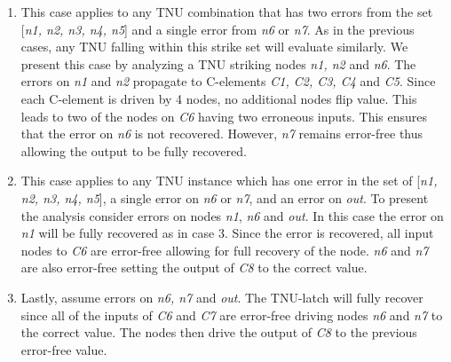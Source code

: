 \begin{enumerate}
	\item This case applies to any TNU combination that has two errors from the set [\textit{n1, n2, n3, n4, n5}] and a single error from \textit{n6} or \textit{n7}. As in the previous cases, any TNU falling within this strike set will evaluate similarly. We present this case by analyzing a TNU striking nodes \textit{n1, n2} and \textit{n6}. The errors on \textit{n1} and \textit{n2} propagate to C-elements \textit{C1, C2, C3, C4} and \textit{C5}. Since each C-element is driven by 4 nodes, no additional nodes flip value. This leads to two of the nodes on \textit{C6} having two erroneous inputs. This ensures that the error on \textit{n6} is not recovered. However, \textit{n7} remains error-free thus allowing the output to be fully recovered. 
	
	\item This case applies to any TNU instance which has one error in the set of [\textit{n1, n2, n3, n4, n5}], a single error on \textit{n6} or \textit{n7}, and an error on \textit{out}. To present the analysis consider errors on nodes \textit{n1}, \textit{n6} and \textit{out}. In this case the error on \textit{n1} will be fully recovered as in case 3. Since the error is recovered, all input nodes to \textit{C6} are error-free allowing for full recovery of the node. \textit{n6} and \textit{n7} are also error-free setting the output of \textit{C8} to the correct value. 
	
	\item Lastly, assume errors on \textit{n6, n7} and \textit{out}. The TNU-latch will fully recover since all of the inputs of \textit{C6} and \textit{C7} are error-free driving nodes \textit{n6} and \textit{n7} to the correct value. The nodes then drive the output of \textit{C8} to the previous error-free value.
	
\end{enumerate}

